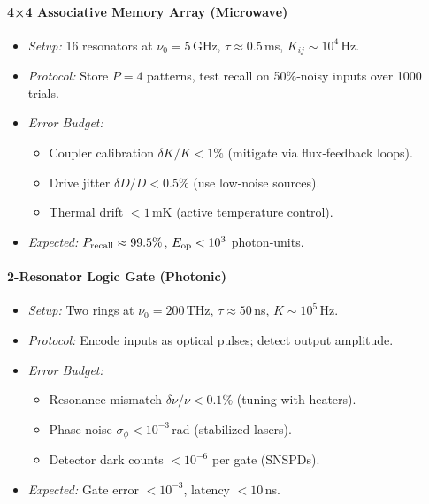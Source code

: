 \paragraph{4×4 Associative Memory Array (Microwave)}
\begin{itemize}
  \item \emph{Setup:} 16 resonators at $\nu_0=5\,$GHz, $\tau\approx0.5\,$ms, $K_{ij}\sim10^4\,$Hz.
  \item \emph{Protocol:} Store $P=4$ patterns, test recall on 50\%‐noisy inputs over 1000 trials.
  \item \emph{Error Budget:}
    \begin{itemize}
      \item Coupler calibration $\delta K/K<1\%$ (mitigate via flux‐feedback loops).
      \item Drive jitter $\delta D/D<0.5\%$ (use low‐noise sources).
      \item Thermal drift $<1\,$mK (active temperature control).
    \end{itemize}
  \item \emph{Expected:} $P_{\rm recall}\approx99.5\%$, $E_{\rm op}<10^3$ photon‐units.
\end{itemize}

\paragraph{2-Resonator Logic Gate (Photonic)}
\begin{itemize}
  \item \emph{Setup:} Two rings at $\nu_0=200\,$THz, $\tau\approx50\,$ns, $K\sim10^5\,$Hz.
  \item \emph{Protocol:} Encode inputs as optical pulses; detect output amplitude.
  \item \emph{Error Budget:}
    \begin{itemize}
      \item Resonance mismatch $\delta\nu/\nu<0.1\%$ (tuning with heaters).
      \item Phase noise $\sigma_\phi<10^{-3}\,$rad (stabilized lasers).
      \item Detector dark counts $<10^{-6}$ per gate (SNSPDs).
    \end{itemize}
  \item \emph{Expected:} Gate error $<10^{-3}$, latency $<10\,$ns.
\end{itemize}

